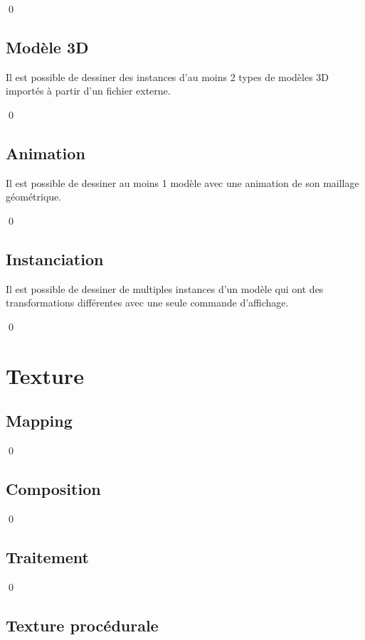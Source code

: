 \documentclass[12pt]{article}
\newcommand{\state}{\noindent}
\begin{document}
\qed

\subsection{Modèle 3D}

\state
Il est possible de dessiner des instances d'au moins 2 types de modèles 3D importés à partir d'un fichier externe.

\qed

\subsection{Animation}

\state
Il est possible de dessiner au moins 1 modèle avec une animation de son maillage géométrique.

\qed

\subsection{Instanciation}

\state
Il est possible de dessiner de multiples instances d'un modèle qui ont des transformations différentes avec une seule commande d'affichage.

\qed

\pagebreak

\section{Texture}

\subsection{Mapping}

\state

\qed

\subsection{Composition}

\state

\qed

\subsection{Traitement}

\state

\qed

\subsection{Texture procédurale}
\end{document}
